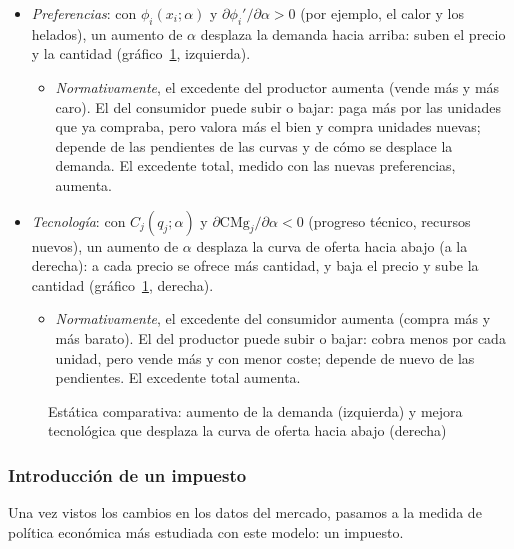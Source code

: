 \documentclass[11pt]{article}
\begin{document}
\begin{itemize}
\item \emph{Preferencias}: con $\phi_i(x_i;\alpha)$ y $\partial\phi_i'/\partial\alpha>0$ (por ejemplo, el calor y los helados), un aumento de $\alpha$ desplaza la demanda hacia arriba: suben el precio y la cantidad (gráfico~\ref{fig:choques}, izquierda).
  \begin{itemize}
  \item \emph{Normativamente}, el excedente del productor aumenta (vende más y más caro). El del consumidor puede subir o bajar: paga más por las unidades que ya compraba, pero valora más el bien y compra unidades nuevas; depende de las pendientes de las curvas y de cómo se desplace la demanda. El excedente total, medido con las nuevas preferencias, aumenta.
  \end{itemize}
\item \emph{Tecnología}: con $C_j(q_j;\alpha)$ y $\partial\mathrm{CMg}_j/\partial\alpha<0$ (progreso técnico, recursos nuevos), un aumento de $\alpha$ desplaza la curva de oferta hacia abajo (a la derecha): a cada precio se ofrece más cantidad, y baja el precio y sube la cantidad (gráfico~\ref{fig:choques}, derecha).
  \begin{itemize}
  \item \emph{Normativamente}, el excedente del consumidor aumenta (compra más y más barato). El del productor puede subir o bajar: cobra menos por cada unidad, pero vende más y con menor coste; depende de nuevo de las pendientes. El excedente total aumenta.
  \end{itemize}
\end{itemize}

\begin{figure}[H]
\centering
\caption{Estática comparativa: aumento de la demanda (izquierda) y mejora tecnológica que desplaza la curva de oferta hacia abajo (derecha)}\label{fig:choques}
\end{figure}

\subsubsection{Introducción de un impuesto}\label{sec:introduccion-impuesto}

Una vez vistos los cambios en los datos del mercado, pasamos a la medida de política económica más estudiada con este modelo: un impuesto.
\end{document}
